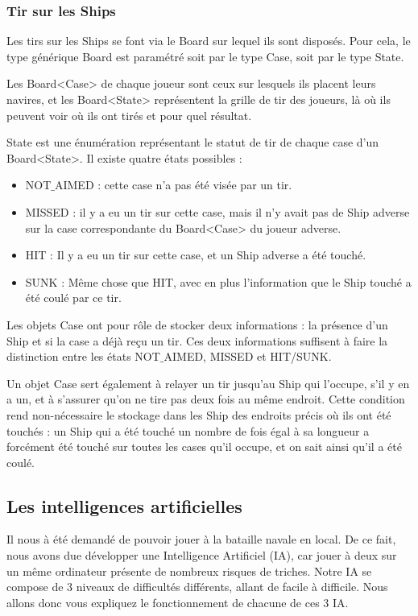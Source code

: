 \subsubsection{Tir sur les Ships}

	Les tirs sur les Ships se font via le Board sur lequel ils sont disposés. Pour cela, le type générique Board est paramétré soit par le type Case, soit par le type State. \newline
	
	Les Board<Case> de chaque joueur sont ceux sur lesquels ils placent leurs navires, et les Board<State> représentent la grille de tir des joueurs, là où ils peuvent voir où ils ont tirés et pour quel résultat. \newline
	
	State est une énumération représentant le statut de tir de chaque case d'un Board<State>. Il existe quatre états possibles :
	\begin{itemize}
		\item NOT$\_$AIMED : cette case n'a pas été visée par un tir.
		\item MISSED : il y a eu un tir sur cette case, mais il n'y avait pas de Ship adverse sur la case correspondante du Board<Case> du joueur adverse.
		\item HIT : Il y a eu un tir sur cette case, et un Ship adverse a été touché.
		\item SUNK : Même chose que HIT, avec en plus l'information que le Ship touché a été coulé par ce tir.
	\end{itemize}


	Les objets Case ont pour rôle de stocker deux informations : la présence d'un Ship et si la case a déjà reçu un tir. Ces deux informations suffisent à faire la distinction entre les états NOT$\_$AIMED, MISSED et HIT/SUNK. \newline
	
	Un objet Case sert également à relayer un tir jusqu'au Ship qui l'occupe, s'il y en a un, et à s'assurer qu'on ne tire pas deux fois au même endroit. Cette condition rend non-nécessaire le stockage dans les Ship des endroits précis où ils ont été touchés : un Ship qui a été touché un nombre de fois égal à sa longueur a forcément été touché sur toutes les cases qu'il occupe, et on sait ainsi qu'il a été coulé.

\subsection{Les intelligences artificielles}
	Il nous à été demandé de pouvoir jouer à la bataille navale en local. 
De ce fait, nous avons due développer une Intelligence Artificiel (IA), car jouer à deux sur un même ordinateur présente de nombreux risques de triches.\newline
	Notre IA se compose de 3 niveaux de difficultés différents, allant de facile à difficile.\newline
	Nous allons donc vous expliquez le fonctionnement de chacune de ces 3 IA.\newline

